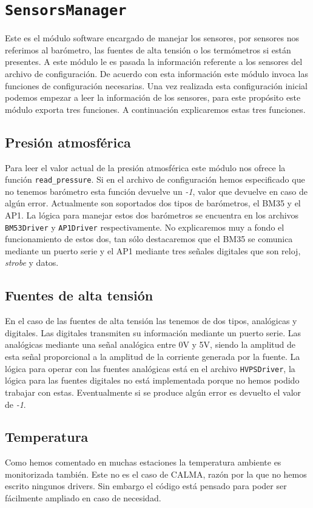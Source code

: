 \section{\texttt{SensorsManager}}
	Este es el módulo software encargado de manejar los sensores, por sensores nos referimos al barómetro, las fuentes de alta tensión o los
	termómetros si están presentes. A este módulo le es pasada la información referente a los sensores del archivo de configuración. De acuerdo
	con esta información este módulo invoca las funciones de configuración necesarias. Una vez realizada esta configuración inicial podemos
	empezar a leer la información de los sensores, para este propósito este módulo exporta tres funciones. A continuación explicaremos estas tres
	funciones.
	\subsection{Presión atmosférica}
		Para leer el valor actual de la presión atmosférica este módulo nos ofrece la función \texttt{read\_pressure}. Si en el archivo de
		configuración hemos especificado que no tenemos barómetro esta función devuelve un \emph{-1}, valor que devuelve en caso de algún
		error. Actualmente son soportados dos tipos de barómetros, el BM35 y el AP1. La lógica para manejar estos dos barómetros
		se encuentra en los archivos \texttt{BM53Driver} y \texttt{AP1Driver} respectivamente. No explicaremos muy a fondo el funcionamiento
		de estos dos, tan sólo destacaremos que el BM35 se comunica mediante un puerto serie y el AP1 mediante tres señales digitales que son
		reloj, \emph{strobe} y datos.
	\subsection{Fuentes de alta tensión}
		En el caso de las fuentes de alta tensión las tenemos de dos tipos, analógicas y digitales. Las digitales transmiten su información
		mediante un puerto serie. Las analógicas mediante una señal analógica entre 0V y 5V, siendo la amplitud de esta señal proporcional a
		la amplitud de la corriente generada por la fuente. La lógica para operar con las fuentes analógicas está en el archivo
		\texttt{HVPSDriver}, la lógica para las fuentes digitales no está implementada porque no hemos podido trabajar con estas.
		Eventualmente si se produce algún error es devuelto el valor de \emph{-1}.
	\subsection{Temperatura}
		Como hemos comentado en muchas estaciones la temperatura ambiente es monitorizada también. Este no es el caso de CALMA, razón por la
		que no hemos escrito ningunos drivers. Sin embargo el código está pensado para poder ser fácilmente ampliado en caso de necesidad. 

